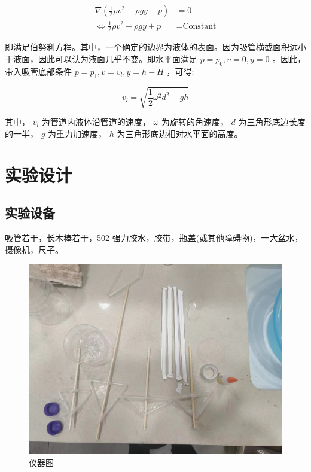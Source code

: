 \documentclass[fontset=windows]{article}
\begin{document}
$$
\begin{aligned}
    \nabla (\frac{1}{2} \rho v ^ 2 + \rho g y + p) &= 0 \\ 
    \iff \frac{1}{2} \rho v ^ 2 + \rho g y + p &= \text{Constant}
\end{aligned}
$$

即满足伯努利方程。其中，一个确定的边界为液体的表面。因为吸管横截面积远小于液面，因此可以认为液面几乎不变。即水平面满足 $p = p_0 , v = 0 , y = 0$ 。因此，带入吸管底部条件 $p = p_1, v = v_l, y = h - H$ ，可得:

$$
v_l = \sqrt{\frac{1}{2}\omega^2 d^2 - gh}
$$

其中， $v_l$ 为管道内液体沿管道的速度， $\omega$ 为旋转的角速度， $d$ 为三角形底边长度的一半， $g$ 为重力加速度， $h$ 为三角形底边相对水平面的高度。

\section{实验设计}

\subsection{实验设备}

吸管若干，长木棒若干，502 强力胶水，胶带，瓶盖(或其他障碍物)，一大盆水，摄像机，尺子。

\begin{figure}[htbp]
    \centering
    \includegraphics[scale=0.15]{10.png}
    \caption{仪器图}
    \label{3}
\end{figure}
\end{document}
